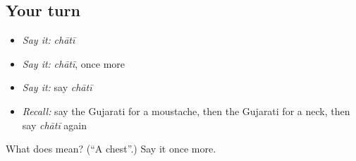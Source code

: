 \subsection*{Your turn}
\begin{itemize}
\raggedright
  \item \emph{Say it:} \emph{chātī}
  \item \emph{Say it:} \emph{chātī}, once more
  \item \emph{Say it:} say \emph{chātī}
  \item \emph{Recall:} say the Gujarati for a moustache, then the Gujarati for a neck, then say \emph{chātī} again
\end{itemize}

\begin{tcolorbox}[breakable,colback=teal!4,colframe=teal!35!black,title={Before you move on}]
What does  mean? (\textquotedblleft{}A chest\textquotedblright{}.) Say it once more.
\end{tcolorbox}
